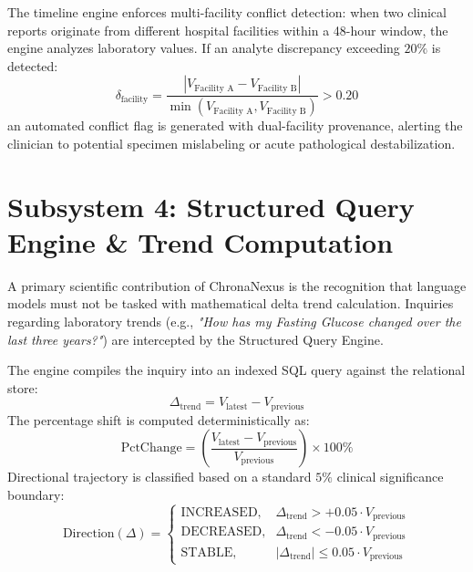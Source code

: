 The timeline engine enforces multi-facility conflict detection: when two clinical reports originate from different hospital facilities within a 48-hour window, the engine analyzes laboratory values. If an analyte discrepancy exceeding $20\%$ is detected:
\begin{equation}
    \delta_{\text{facility}} = \frac{|V_{\text{Facility A}} - V_{\text{Facility B}}|}{\min(V_{\text{Facility A}}, V_{\text{Facility B}})} > 0.20
\end{equation}
an automated conflict flag is generated with dual-facility provenance, alerting the clinician to potential specimen mislabeling or acute pathological destabilization.


\section{Subsystem 4: Structured Query Engine \& Trend Computation}
\label{sec:impl_subsystem_query_engine}

A primary scientific contribution of ChronaNexus is the recognition that language models must not be tasked with mathematical delta trend calculation. Inquiries regarding laboratory trends (e.g., \textit{"How has my Fasting Glucose changed over the last three years?"}) are intercepted by the Structured Query Engine.

The engine compiles the inquiry into an indexed SQL query against the relational store:
\begin{equation}
    \Delta_{\text{trend}} = V_{\text{latest}} - V_{\text{previous}}
\end{equation}
The percentage shift is computed deterministically as:
\begin{equation}
    \text{PctChange} = \left(\frac{V_{\text{latest}} - V_{\text{previous}}}{V_{\text{previous}}}\right) \times 100\%
\end{equation}
Directional trajectory is classified based on a standard $5\%$ clinical significance boundary:
\begin{equation}
    \text{Direction}(\Delta) = \begin{cases}
        \text{INCREASED}, & \Delta_{\text{trend}} > +0.05 \cdot V_{\text{previous}} \\
        \text{DECREASED}, & \Delta_{\text{trend}} < -0.05 \cdot V_{\text{previous}} \\
        \text{STABLE}, & |\Delta_{\text{trend}}| \le 0.05 \cdot V_{\text{previous}}
    \end{cases}
\end{equation}


